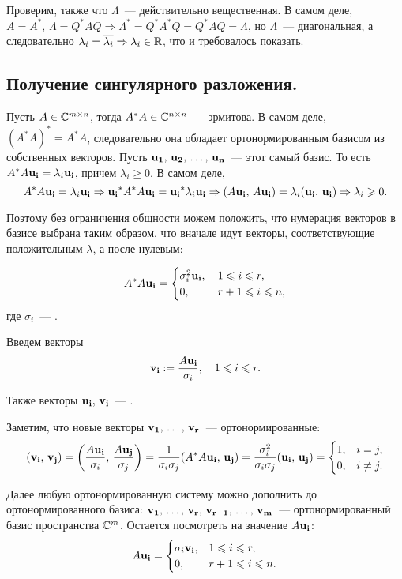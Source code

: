 Проверим, также что $\Lambda$~--- действительно вещественная. В самом деле,
$A=A^*,\, \Lambda=Q^*AQ\Rightarrow \Lambda^*=Q^*A^*Q=Q^*AQ=\Lambda$, но $\Lambda$~--- диагональная, а следовательно
$\lambda_i=\overline{\lambda_i}\Rightarrow\lambda_i\in\mathbb{R}$, что и требовалось показать.

\subsection{Получение сингулярного разложения.}
Пусть $A\in\mathbb{C}^{m\times n}$, тогда $A^*A\in\mathbb{C}^{n\times n}$~--- эрмитова. В самом деле,
$(A^*A)^*=A^*A$, следовательно она обладает ортонормированным базисом из собственных векторов.
Пусть $\mathbf{u_1},\, \mathbf{u_2},\,\ldots,\, \mathbf{u_n}$~--- этот самый базис.
То есть $A^*A\mathbf{u_i}=\lambda_i\mathbf{u_i}$, причем $\lambda_i\geqslant 0$. В самом деле,
\[
    A^*A\mathbf{u_i}=\lambda_i\mathbf{u_i}\Rightarrow
    \mathbf{u_i}^*A^*A\mathbf{u_i}=\mathbf{u_i}^*\lambda_i\mathbf{u_i}\Rightarrow
    (A\mathbf{u_i},\, A\mathbf{u_i})=\lambda_i(\mathbf{u_i},\, \mathbf{u_i})\Rightarrow
    \lambda_i\geqslant 0.
\]

Поэтому без ограничения общности можем положить, что нумерация векторов в базисе выбрана таким образом,
что вначале идут векторы, соответствующие положительным $\lambda$, а после нулевым:

\[
    A^*A\mathbf{u_i}=\begin{cases}
        \sigma_{i}^2\mathbf{u_i},\, & 1\leqslant i\leqslant r,   \\
        0,\,                      & r+1\leqslant i\leqslant n,
    \end{cases}
\]
где $\sigma_i$~--- .

Введем векторы
\[
    \mathbf{v_i}:=\dfrac{A\mathbf{u_i}}{\sigma_i},\quad 1\leqslant i\leqslant r.
\]

Также векторы $\mathbf{u_i},\, \mathbf{v_i}$~--- .

Заметим, что новые векторы $\mathbf{v_1},\,\ldots,\, \mathbf{v_r}$~--- ортонормированные:
\[
    (\mathbf{v_i},\, \mathbf{v_j}) = \left(\dfrac{A\mathbf{u_i}}{\sigma_i},\, \dfrac{A\mathbf{u_j}}{\sigma_j}\right)=
    \dfrac{1}{\sigma_i\sigma_j}(A^*A\mathbf{u_i},\, \mathbf{u_j})=\dfrac{\sigma_i^2}{\sigma_i\sigma_j}(\mathbf{u_i},\,
    \mathbf{u_j})=\begin{cases}
        1, & i=j,     \\
        0, & i\neq j.
    \end{cases}
\]

Далее любую ортонормированную систему можно дополнить до ортонормированного базиса:
$\mathbf{v_1},\,\ldots,\,\mathbf{v_r},\,\mathbf{v_{r+1}},\,\ldots,\,\mathbf{v_m}$~--- ортонормированный базис
пространства $\mathbb{C}^m$. Остается посмотреть на значение $A\mathbf{u_i}$:
\[
    A\mathbf{u_i}=\begin{cases}
        \sigma_i\mathbf{v_i}, & 1\leqslant i\leqslant r,   \\
        0,                  & r+1\leqslant i\leqslant n.
    \end{cases}
\]

